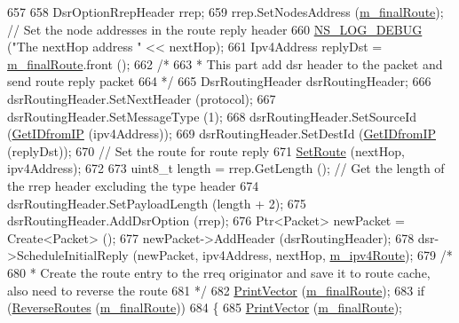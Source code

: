\begin{DoxyCode}
657 
658           DsrOptionRrepHeader rrep;
659           rrep.SetNodesAddress (\hyperlink{classns3_1_1dsr_1_1DsrOptions_a3fe6a72ebaae73724ce63383635b7af8}{m\_finalRoute});     \textcolor{comment}{// Set the node addresses in the route reply
       header}
660           \hyperlink{group__logging_ga413f1886406d49f59a6a0a89b77b4d0a}{NS\_LOG\_DEBUG} (\textcolor{stringliteral}{"The nextHop address "} << nextHop);
661           Ipv4Address replyDst = \hyperlink{classns3_1_1dsr_1_1DsrOptions_a3fe6a72ebaae73724ce63383635b7af8}{m\_finalRoute}.front ();
662           \textcolor{comment}{/*}
663 \textcolor{comment}{           * This part add dsr header to the packet and send route reply packet}
664 \textcolor{comment}{           */}
665           DsrRoutingHeader dsrRoutingHeader;
666           dsrRoutingHeader.SetNextHeader (protocol);
667           dsrRoutingHeader.SetMessageType (1);
668           dsrRoutingHeader.SetSourceId (\hyperlink{classns3_1_1dsr_1_1DsrOptions_a7e53a9a0421c607e17866e7dd0dd5440}{GetIDfromIP} (ipv4Address));
669           dsrRoutingHeader.SetDestId (\hyperlink{classns3_1_1dsr_1_1DsrOptions_a7e53a9a0421c607e17866e7dd0dd5440}{GetIDfromIP} (replyDst));
670           \textcolor{comment}{// Set the route for route reply}
671           \hyperlink{classns3_1_1dsr_1_1DsrOptions_af749b76db4626ae64bc37001a5353b99}{SetRoute} (nextHop, ipv4Address);
672 
673           uint8\_t length = rrep.GetLength ();  \textcolor{comment}{// Get the length of the rrep header excluding the type
       header}
674           dsrRoutingHeader.SetPayloadLength (length + 2);
675           dsrRoutingHeader.AddDsrOption (rrep);
676           Ptr<Packet> newPacket = Create<Packet> ();
677           newPacket->AddHeader (dsrRoutingHeader);
678           dsr->ScheduleInitialReply (newPacket, ipv4Address, nextHop, 
      \hyperlink{classns3_1_1dsr_1_1DsrOptions_ae4785209eae1d101cb8bd2d3b392d2ad}{m\_ipv4Route});
679           \textcolor{comment}{/*}
680 \textcolor{comment}{           * Create the route entry to the rreq originator and save it to route cache, also need to reverse
       the route}
681 \textcolor{comment}{           */}
682           \hyperlink{classns3_1_1dsr_1_1DsrOptions_a44ae8e58769880ec9c0150bb28652350}{PrintVector} (\hyperlink{classns3_1_1dsr_1_1DsrOptions_a3fe6a72ebaae73724ce63383635b7af8}{m\_finalRoute});
683           \textcolor{keywordflow}{if} (\hyperlink{classns3_1_1dsr_1_1DsrOptions_a49547f030b51a51499c36f9b5802ec3c}{ReverseRoutes} (\hyperlink{classns3_1_1dsr_1_1DsrOptions_a3fe6a72ebaae73724ce63383635b7af8}{m\_finalRoute}))
684             \{
685               \hyperlink{classns3_1_1dsr_1_1DsrOptions_a44ae8e58769880ec9c0150bb28652350}{PrintVector} (\hyperlink{classns3_1_1dsr_1_1DsrOptions_a3fe6a72ebaae73724ce63383635b7af8}{m\_finalRoute});

\end{DoxyCode}
